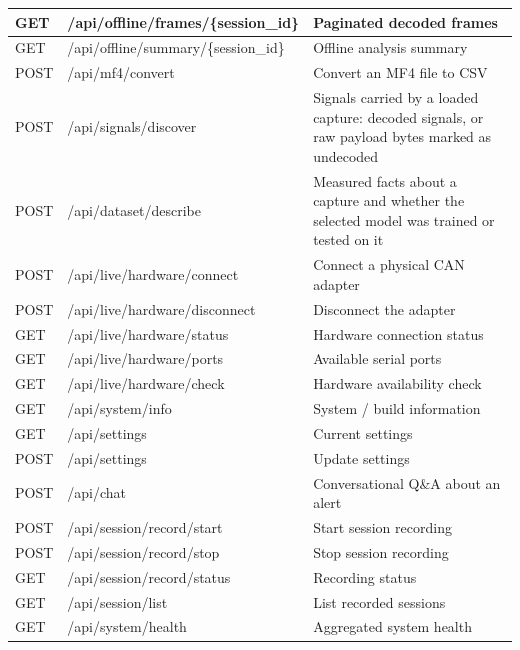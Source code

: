 \begin{longtable}{|p{1.4cm}|p{7.2cm}|p{6.0cm}|}
\hline
GET  & /api/offline/frames/\{session\_id\}      & Paginated decoded frames \\
\hline
GET  & /api/offline/summary/\{session\_id\}     & Offline analysis summary \\
\hline
POST & /api/mf4/convert                        & Convert an MF4 file to CSV \\
\hline
POST & /api/signals/discover                   & Signals carried by a loaded capture: decoded signals, or raw payload bytes marked as undecoded \\
\hline
POST & /api/dataset/describe                   & Measured facts about a capture and whether the selected model was trained or tested on it \\
\hline
POST & /api/live/hardware/connect               & Connect a physical CAN adapter \\
\hline
POST & /api/live/hardware/disconnect            & Disconnect the adapter \\
\hline
GET  & /api/live/hardware/status                & Hardware connection status \\
\hline
GET  & /api/live/hardware/ports                 & Available serial ports \\
\hline
GET  & /api/live/hardware/check                 & Hardware availability check \\
\hline
GET  & /api/system/info                        & System / build information \\
\hline
GET  & /api/settings                           & Current settings \\
\hline
POST & /api/settings                           & Update settings \\
\hline
POST & /api/chat                               & Conversational Q\&A about an alert \\
\hline
POST & /api/session/record/start                & Start session recording \\
\hline
POST & /api/session/record/stop                 & Stop session recording \\
\hline
GET  & /api/session/record/status               & Recording status \\
\hline
GET  & /api/session/list                       & List recorded sessions \\
\hline
GET  & /api/system/health                      & Aggregated system health \\
\hline
\end{longtable}
